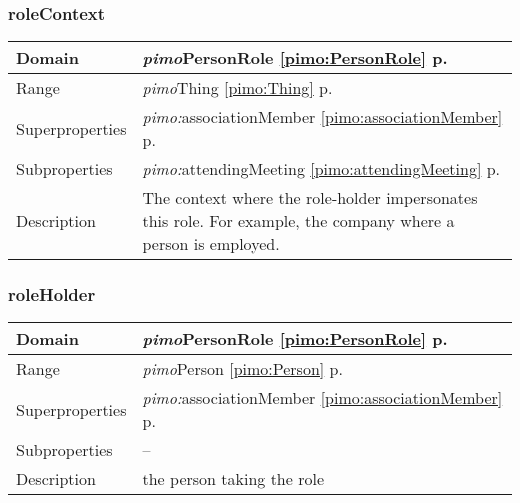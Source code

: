 \subsubsection{roleContext} 
\label{pimo:roleContext}
\begin{longtable}{|p{}|p{}|}
 \hline 
Domain & {\it pimo}\hspace{1pt}PersonRole \ref{pimo:PersonRole} p. \pageref{pimo:PersonRole}\\ \hline 
Range & {\it pimo}\hspace{1pt}Thing \ref{pimo:Thing} p. \pageref{pimo:Thing}\\ \hline 
Superproperties & {\it pimo:}associationMember \ref{pimo:associationMember} p. \pageref{pimo:associationMember}\\ \hline 
Subproperties & {\it pimo:}attendingMeeting \ref{pimo:attendingMeeting} p. \pageref{pimo:attendingMeeting}\\ \hline 
Description & The context where the role-holder impersonates this role. For example, the company where a person is employed.\\ \hline 
\end{longtable}


\subsubsection{roleHolder} 
\label{pimo:roleHolder}
\begin{longtable}{|p{}|p{}|}
 \hline 
Domain & {\it pimo}\hspace{1pt}PersonRole \ref{pimo:PersonRole} p. \pageref{pimo:PersonRole}\\ \hline 
Range & {\it pimo}\hspace{1pt}Person \ref{pimo:Person} p. \pageref{pimo:Person}\\ \hline 
Superproperties & {\it pimo:}associationMember \ref{pimo:associationMember} p. \pageref{pimo:associationMember}\\ \hline 
Subproperties & --\\ \hline 
Description & the person taking the role\\ \hline 
\end{longtable}


